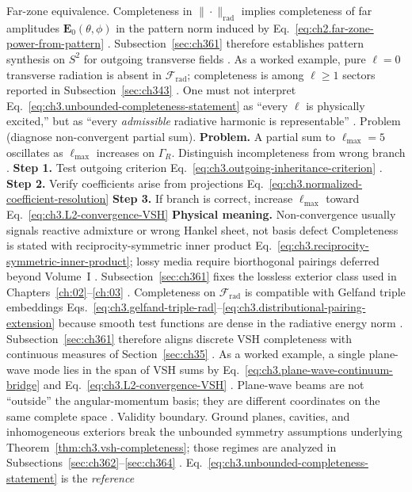 Far-zone equivalence. Completeness in \(\|\cdot\|_{\mathrm{rad}}\) implies completeness of far amplitudes
\(\mathbf{E}_{0}(\theta,\phi)\) in the pattern norm induced by Eq.~\eqref{eq:ch2.far-zone-power-from-pattern}
. Subsection~\ref{sec:ch361} therefore establishes pattern synthesis on \(S^{2}\) for
outgoing transverse fields .
As a worked example, pure \(\ell=0\) transverse radiation is absent in \(\mathcal{F}_{\mathrm{rad}}\); completeness is among
\(\ell\ge1\) sectors reported in Subsection~\ref{sec:ch343} . One must not
interpret Eq.~\eqref{eq:ch3.unbounded-completeness-statement} as ``every \(\ell\) is physically excited,'' but as
``every \emph{admissible} radiative harmonic is representable'' .
Problem (diagnose non-convergent partial sum). \textbf{Problem.} A partial sum to \(\ell_{\max}=5\) oscillates as \(\ell_{\max}\) increases on \(\Gamma_R\).
Distinguish incompleteness from wrong branch .
\textbf{Step 1.} Test outgoing criterion Eq.~\eqref{eq:ch3.outgoing-inheritance-criterion} .
\textbf{Step 2.} Verify coefficients arise from projections Eq.~\eqref{eq:ch3.normalized-coefficient-resolution}
\textbf{Step 3.} If branch is correct, increase \(\ell_{\max}\) toward Eq.~\eqref{eq:ch3.L2-convergence-VSH}
\textbf{Physical meaning.} Non-convergence usually signals reactive admixture or wrong Hankel sheet, not basis defect
Completeness is stated with reciprocity-symmetric inner product
Eq.~\eqref{eq:ch3.reciprocity-symmetric-inner-product}; lossy media require biorthogonal pairings deferred beyond
Volume~I . Subsection~\ref{sec:ch361} fixes the lossless exterior class used in
Chapters~\ref{ch:02}--\ref{ch:03} .
Completeness on \(\mathcal{F}_{\mathrm{rad}}\) is compatible with Gelfand triple embeddings
Eqs.~\eqref{eq:ch3.gelfand-triple-rad}--\eqref{eq:ch3.distributional-pairing-extension} because smooth test functions
are dense in the radiative energy norm . Subsection~\ref{sec:ch361} therefore aligns
discrete VSH completeness with continuous measures of Section~\ref{sec:ch35} .
As a worked example, a single plane-wave mode lies in the span of VSH sums by Eq.~\eqref{eq:ch3.plane-wave-continuum-bridge} and
Eq.~\eqref{eq:ch3.L2-convergence-VSH} . Plane-wave beams are not ``outside'' the
angular-momentum basis; they are different coordinates on the same complete space .
Validity boundary. Ground planes, cavities, and inhomogeneous exteriors break the unbounded symmetry assumptions underlying
Theorem~\ref{thm:ch3.vsh-completeness}; those regimes are analyzed in Subsections~\ref{sec:ch362}--\ref{sec:ch364}
. Eq.~\eqref{eq:ch3.unbounded-completeness-statement} is the \emph{reference}
